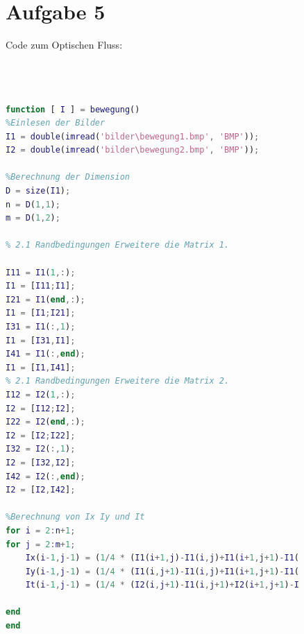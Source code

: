\documentclass[12pt,a4paper,oneside]{article}
\begin{document}
\newpage

\begin{figure} 
\section*{Aufgabe 5}
Code zum Optischen Fluss:
\begin{lstlisting}[language=Matlab,
frame=single,breaklines=true,keepspaces=true]



function [ I ] = bewegung()
%Einlesen der Bilder
I1 = double(imread('bilder\bewegung1.bmp', 'BMP'));
I2 = double(imread('bilder\bewegung2.bmp', 'BMP'));

%Berechnung der Dimension
D = size(I1);
n = D(1,1);
m = D(1,2);

% 2.1 Randbedingungen Erweitere die Matrix 1.

I11 = I1(1,:);
I1 = [I11;I1];
I21 = I1(end,:);
I1 = [I1;I21];
I31 = I1(:,1);
I1 = [I31,I1];
I41 = I1(:,end);
I1 = [I1,I41];
% 2.1 Randbedingungen Erweitere die Matrix 2.
I12 = I2(1,:);
I2 = [I12;I2];
I22 = I2(end,:);
I2 = [I2;I22];
I32 = I2(:,1);
I2 = [I32,I2];
I42 = I2(:,end);
I2 = [I2,I42];

%Berechnung von Ix Iy und It
for i = 2:n+1;
for j = 2:m+1;
    Ix(i-1,j-1) = (1/4 * (I1(i+1,j)-I1(i,j)+I1(i+1,j+1)-I1(i,j+1)+I2(i+1,j)-I2(i,j)+I2(i+1,j+1)-I2(i,j+1)));
    Iy(i-1,j-1) = (1/4 * (I1(i,j+1)-I1(i,j)+I1(i+1,j+1)-I1(i+1,j)+I2(i,j+1)-I2(i,j)+I2(i+1,j+1)-I2(i+1,j)));
    It(i-1,j-1) = (1/4 * (I2(i,j+1)-I1(i,j+1)+I2(i+1,j+1)-I1(i+1,j+1)+I2(i+1,j)-I1(i+1,j)+I2(i,j)-I1(i,j)));
        
end
end


\end{lstlisting}


\end{figure} 

\newpage
\end{document}
